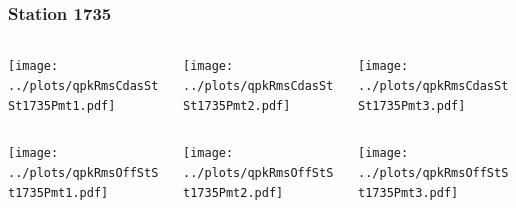 \documentclass[aspectratio=169]{beamer}
\begin{document}
\begin{frame} 
  \frametitle{Station 1735}
  \begin{center}
    \begin{columns}
      \begin{column}{0.33\textwidth}
        \texttt{[image: ../plots/qpkRmsCdasStSt1735Pmt1.pdf]}
      \end{column}
      \begin{column}{0.33\textwidth}
        \texttt{[image: ../plots/qpkRmsCdasStSt1735Pmt2.pdf]}
      \end{column}
      \begin{column}{0.33\textwidth}
        \texttt{[image: ../plots/qpkRmsCdasStSt1735Pmt3.pdf]}
      \end{column}
    \end{columns}
  \end{center}

  \begin{center}
    \begin{columns}
      \begin{column}{0.33\textwidth}
        \texttt{[image: ../plots/qpkRmsOffStSt1735Pmt1.pdf]}
      \end{column}
      \begin{column}{0.33\textwidth}
        \texttt{[image: ../plots/qpkRmsOffStSt1735Pmt2.pdf]}
      \end{column}
      \begin{column}{0.33\textwidth}
        \texttt{[image: ../plots/qpkRmsOffStSt1735Pmt3.pdf]}
      \end{column}
    \end{columns}
  \end{center}
\end{frame}
\end{document}
